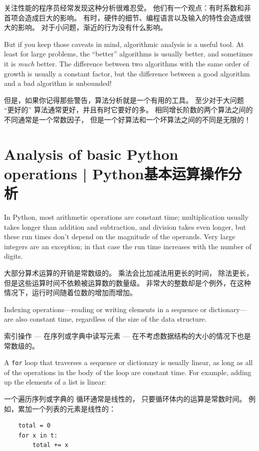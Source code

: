 关注性能的程序员经常发现这种分析很难忍受。  他们有一个观点：有时系数和非首项会造成巨大的影响。  有时，硬件的细节、编程语言以及输入的特性会造成很大的影响。  对于小问题，渐近的行为没有什么影响。

But if you keep those caveats in mind, algorithmic analysis is a
useful tool.  At least for large problems, the ``better'' algorithms
is usually better, and sometimes it is {\em much} better.  The
difference between two algorithms with the same order of growth is
usually a constant factor, but the difference between a good algorithm
and a bad algorithm is unbounded!

但是，如果你记得那些警告，算法分析就是一个有用的工具。
至少对于大问题 ``更好的'' 算法通常更好，并且有时它要好的多。
相同增长阶数的两个算法之间的不同通常是一个常数因子，
但是一个好算法和一个坏算法之间的不同是无限的！


\section{Analysis of basic Python operations  |  Python基本运算操作分析}

In Python, most arithmetic operations are constant time;
multiplication usually takes longer than addition and subtraction, and
division takes even longer, but these run times don't depend on the
magnitude of the operands.  Very large integers are an exception; in
that case the run time increases with the number of digits.

大部分算术运算的开销是常数级的。 乘法会比加减法用更长的时间，
除法更长，但是这些运算时间不依赖被运算数的数量级。  
非常大的整数却是个例外，在这种情况下，运行时间随着位数的增加而增加。  

Indexing operations---reading or writing elements in a sequence
or dictionary---are also constant time, regardless of the size
of the data structure.

索引操作 --- 在序列或字典中读写元素 --- 在不考虑数据结构的大小的情况下也是常数级的。

A {\tt for} loop that traverses a sequence or dictionary is
usually linear, as long as all of the operations in the body
of the loop are constant time.  For example, adding up the
elements of a list is linear:

一个遍历序列或字典的  循环通常是线性的， 只要循环体内的运算是常数时间。
例如，累加一个列表的元素是线性的：


\begin{lstlisting}
    total = 0
    for x in t:
        total += x
\end{lstlisting}

